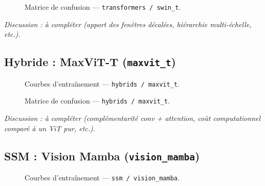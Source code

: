 \begin{figure}[H]
    \centering
    \caption{Matrice de confusion --- \texttt{transformers / swin\_t}.}
    \label{fig:cm_transformers_swin_t}
\end{figure}


\textit{Discussion : à compléter (apport des fenêtres décalées,
hiérarchie multi-échelle, etc.).}

\subsection{Hybride : MaxViT-T (\texttt{maxvit\_t})}
\label{subsec:hybrids_maxvit_t}

\begin{figure}[H]
    \centering
    \caption{Courbes d'entraînement --- \texttt{hybrids / maxvit\_t}.}
    \label{fig:hist_hybrids_maxvit_t}
\end{figure}

\begin{figure}[H]
    \centering
    \caption{Matrice de confusion --- \texttt{hybrids / maxvit\_t}.}
    \label{fig:cm_hybrids_maxvit_t}
\end{figure}


\textit{Discussion : à compléter (complémentarité conv + attention,
coût computationnel comparé à un ViT pur, etc.).}

\subsection{SSM : Vision Mamba (\texttt{vision\_mamba})}
\label{subsec:ssm_vision_mamba}

\begin{figure}[H]
    \centering
    \caption{Courbes d'entraînement --- \texttt{ssm / vision\_mamba}.}
    \label{fig:hist_ssm_vision_mamba}
\end{figure}

